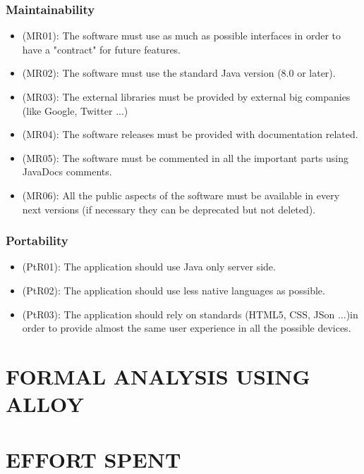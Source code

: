 \documentclass[a4paper,leqno]{book}
\begin{document}
\subsection{Maintainability}
\begin{itemize}
\item (MR01): The software must use as much as possible interfaces in order to have a "contract" for future features.
\item (MR02): The software must use the standard Java version (8.0 or later).
\item (MR03): The external libraries must be provided by external big companies (like Google, Twitter ...)
\item (MR04): The software releases must be provided with documentation related.
\item (MR05): The software must be commented in all the important parts using JavaDocs comments.
\item (MR06): All the public aspects of the software must be available in every next versions (if necessary they can be deprecated but not deleted).
\end{itemize}

\subsection{Portability}
\begin{itemize}
\item (PtR01): The application should use Java only server side.
\item (PtR02): The application should use less native languages as possible.
\item (PtR03): The application should rely on standards (HTML5, CSS, JSon ...)in order to provide almost the same user experience in all the possible devices.
\end{itemize}

\chapter{FORMAL ANALYSIS USING ALLOY}

\chapter{EFFORT SPENT}
\end{document}
